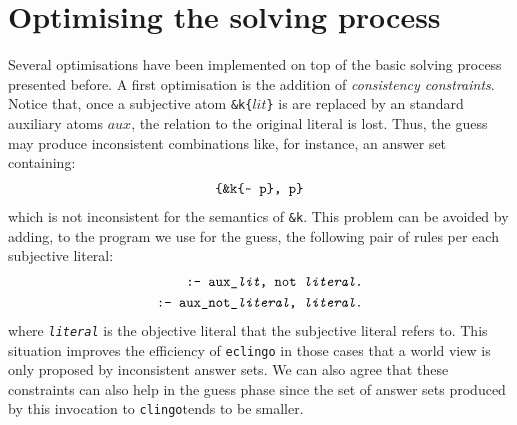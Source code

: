 \documentclass{new_tlp}
\newcommand{\textapprox}{\raisebox{0.5ex}{\texttildelow}}
\def\eclingo{{\tt eclingo}}
\def\\wviews{{\tt \wviews}}
\def\clingo{{\tt clingo}}
\def\wviews{{\tt wviews}}
\begin{document}
\section{Optimising the solving process}
\label{sec:optim}
Several optimisations have been implemented on top of the basic solving process presented before.
%
A first optimisation is the addition of \emph{consistency constraints}.
%
Notice that, once a subjective atom {\tt \&k\{$lit$\}} is are replaced by an standard auxiliary atoms $aux$, the relation to the original literal is lost.
%
Thus, the guess may produce inconsistent combinations like, for instance, an answer set containing:
\begin{align*}
	\texttt{\{\&k\{\textapprox\ p\}, p\}}
\end{align*}
which is not inconsistent for the semantics of {\tt \&k}.
This problem can be avoided by adding, to the program we use for the guess, the following pair of rules per each subjective literal:
\begin{align}
\texttt{:- aux\_\emph{lit}, not \emph{literal}.} \label{r:1} \\
\texttt{:- aux\_not\_\emph{literal}, \emph{literal}.} \label{r:2}
\end{align}
where \texttt{\emph{literal}} is the objective literal that the subjective literal refers to.
%
This situation improves the efficiency of \eclingo{} in those cases that a world view is only proposed by inconsistent answer sets. We can also agree that these constraints can also help in the guess phase since the set of answer sets produced by this invocation to \clingo tends to be smaller.
\end{document}
